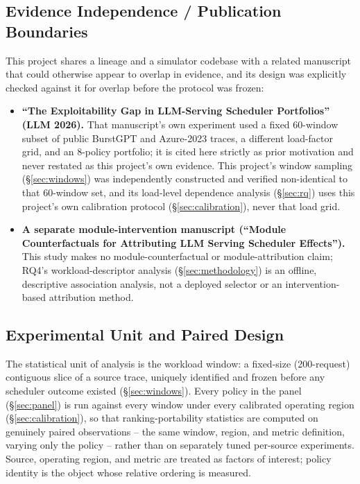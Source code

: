 \subsection{Evidence Independence / Publication Boundaries}
\label{sec:evidence-boundaries}

This project shares a lineage and a simulator codebase with a related
manuscript that could otherwise appear to overlap in evidence, and its
design was explicitly checked against it for overlap before the protocol
was frozen:

\begin{itemize}
  \item \textbf{``The Exploitability Gap in LLM-Serving Scheduler
    Portfolios'' (LLM 2026).} That manuscript's own experiment used a
    fixed 60-window subset of public BurstGPT and Azure-2023 traces, a
    different load-factor grid, and an 8-policy portfolio; it is cited
    here strictly as prior motivation and never restated as this
    project's own evidence. This project's window sampling
    (\S\ref{sec:windows}) was independently constructed and verified
    non-identical to that 60-window set, and its load-level dependence
    analysis (\S\ref{sec:rq}) uses this project's own calibration
    protocol (\S\ref{sec:calibration}), never that load grid.
  \item \textbf{A separate module-intervention manuscript (``Module
    Counterfactuals for Attributing LLM Serving Scheduler Effects'').}
    This study makes no module-counterfactual or module-attribution
    claim; RQ4's workload-descriptor analysis (\S\ref{sec:methodology})
    is an offline, descriptive association analysis, not a deployed
    selector or an intervention-based attribution method.
\end{itemize}

\subsection{Experimental Unit and Paired Design}
\label{sec:unit}

The statistical unit of analysis is the workload window: a fixed-size
(200-request) contiguous slice of a source trace, uniquely identified and
frozen before any scheduler outcome existed (\S\ref{sec:windows}). Every
policy in the panel (\S\ref{sec:panel}) is run against every window under
every calibrated operating region (\S\ref{sec:calibration}), so that
ranking-portability statistics are computed on genuinely paired
observations -- the same window, region, and metric definition, varying
only the policy -- rather than on separately tuned per-source experiments.
Source, operating region, and metric are treated as factors of interest;
policy identity is the object whose relative ordering is measured.


